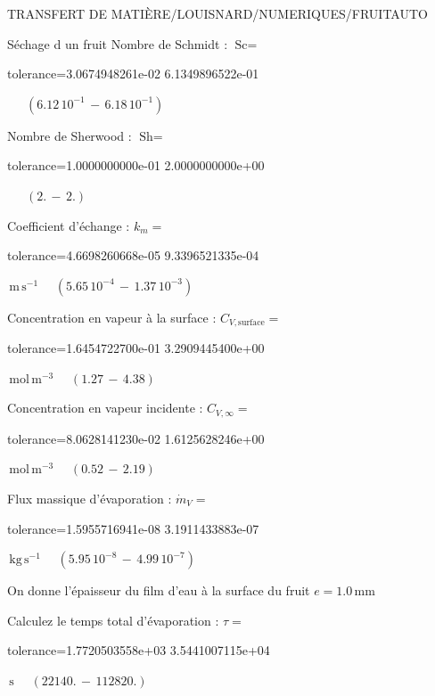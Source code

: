 \documentclass[12pt]{article}
\begin{document}
\begin{quiz}{TRANSFERT DE MATIÈRE/LOUISNARD/NUMERIQUES/FRUITAUTO}
\begin{cloze}{Séchage d un fruit}
Nombre de Schmidt : $\text{Sc} =  $
\begin{numerical}[points=1] 
\item[tolerance={3.0674948261e-02}] 6.1349896522e-01 
\end{numerical} 
 $\,$ 
 $ \quad ( 6.12 \, 10^{-1}  \, - \,  6.18 \, 10^{-1} ) $ 

Nombre de Sherwood : $\text{Sh} =  $
\begin{numerical}[points=2] 
\item[tolerance={1.0000000000e-01}] 2.0000000000e+00 
\end{numerical} 
 $\,$ 
 $ \quad (2. \, - \, 2.) $ 

Coefficient d'échange : $k_m =  $
\begin{numerical}[points=1] 
\item[tolerance={4.6698260668e-05}] 9.3396521335e-04 
\end{numerical} 
 $\,  \mathrm{m}\,  \mathrm{s}^{-1}$ 
 $ \quad ( 5.65 \, 10^{-4}  \, - \,  1.37 \, 10^{-3} ) $ 

Concentration en vapeur à la surface : $C_{V, \text{surface}} =  $
\begin{numerical}[points=2] 
\item[tolerance={1.6454722700e-01}] 3.2909445400e+00 
\end{numerical} 
 $\,  \mathrm{mol}\,  \mathrm{m}^{-3}$ 
 $ \quad (1.27 \, - \, 4.38) $ 

Concentration en vapeur incidente : $C_{V, \infty} =  $
\begin{numerical}[points=2] 
\item[tolerance={8.0628141230e-02}] 1.6125628246e+00 
\end{numerical} 
 $\,  \mathrm{mol}\,  \mathrm{m}^{-3}$ 
 $ \quad (0.52 \, - \, 2.19) $ 

Flux massique d'évaporation : $\dot{m}_V =  $
\begin{numerical}[points=1] 
\item[tolerance={1.5955716941e-08}] 3.1911433883e-07 
\end{numerical} 
 $\,  \mathrm{kg}\,  \mathrm{s}^{-1}$ 
 $ \quad ( 5.95 \, 10^{-8}  \, - \,  4.99 \, 10^{-7} ) $ 

 

On donne l'épaisseur du film d'eau à la surface du fruit $e = 1.0\,  \mathrm{mm} $

Calculez le temps total d'évaporation : $\tau =  $
\begin{numerical}[points=2] 
\item[tolerance={1.7720503558e+03}] 3.5441007115e+04 
\end{numerical} 
 $\,  \mathrm{s}$ 
 $ \quad (22140. \, - \, 112820.) $ 


\end{cloze}
\end{quiz}
\end{document}
